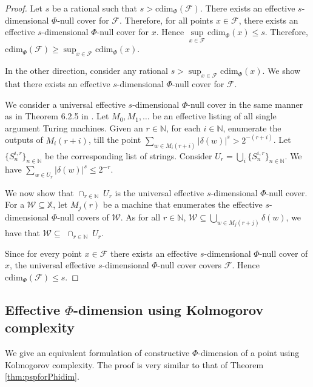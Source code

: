 \documentclass[11pt]{article}
\newcommand{\N}{\mathbb{N}}
\newcommand{\cdim}{\mathrm{cdim}}
\newcommand{\F}{{\mathcal{F}}}
\newcommand{\X}{{\mathbb{X}}}
\renewcommand{\F}{\mathcal{F}}
\newcommand{\x}{x}
\begin{document}
\begin{proof}
	Let $s$ be a rational such that $s > \cdim_\Phi(\F)$. There exists an effective $s$-dimensional $\Phi$-null cover for $\F$. Therefore, for all points $x \in \F$, there exists an effective $s$-dimensional $\Phi$-null cover for $x$. Hence $\sup\limits_{\x \in \F} \cdim_\Phi(\x) \leq s$.
	Therefore, $\cdim_\Phi(\F) \geq \sup_{\x \in \F} \cdim_\Phi(\x)$. 
	
	In the other direction, consider any rational $s > \sup_{\x \in \F} \cdim_\Phi(\x)$. We show that there exists an effective $s$-dimensional $\Phi$-null cover for $\F$. 
	
	We consider a universal effective $s$-dimensional $\Phi$-null cover in the same manner as in Theorem 6.2.5 in \cite{Downey10}. Let $M_0, M_1, \dots$ be an effective listing of all single argument Turing machines. Given an $r \in \N$, for each $i \in \N$, 
	enumerate the outputs of $M_i(r+i)$, till the point $\sum_{w \in M_i(r+i)} |\delta(w)|^s > 2^{-(r+i)}$. Let $\{S_n^{i,r}\}_{n \in \N} $ be the corresponding list of strings. Consider $U_r = \bigcup_{i} \{S_n^{i,r}\}_{n \in \N}$.  We have $\sum_{w \in U_r} |\delta(w)|^s \leq 2^{-r}$. 
	
	We now show that $\cap_{r \in \N} \; U_r$ is the universal effective $s$-dimensional $\Phi$-null cover. For a $\mathcal{W} \subseteq \X$, let $M_j(r)$ be a machine that enumerates the effective $s$-dimensional $\Phi$-null covers of $\mathcal{W}$. As for all $r \in \N$, $\mathcal{W} \subseteq \bigcup_{w \in M_j(r+j)} \delta(w)$, we have that $\mathcal{W} \subseteq $ $\cap_{r \in \N} \; U_r$.
	
	
	Since for every point $\x \in \F$ there exists an effective $s$-dimensional $\Phi$-null cover of $x$,  the universal effective $s$-dimensional $\Phi$-null cover covers $\F$. Hence $\cdim_{\Phi}(\F) \leq s$.
\end{proof}


\subsection{ Effective $\Phi$-dimension using Kolmogorov complexity} 


We give an equivalent formulation of constructive $\Phi$-dimension 
of a point using Kolmogorov complexity. The proof is very similar to that of Theorem \ref{thm:pspforPhidim}.
\end{document}
